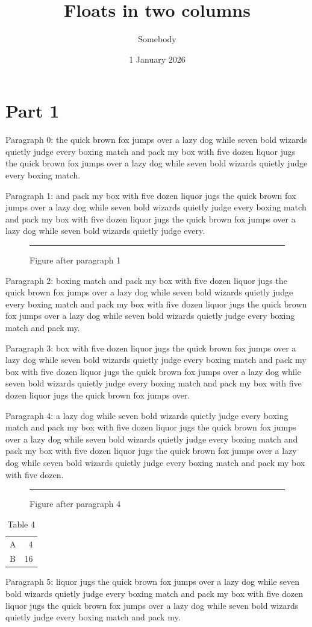 \documentclass[twocolumn]{article}
\begin{document}
\title{Floats in two columns}\author{Somebody}\date{1 January 2026}
\maketitle
\section{Part 1}
Paragraph 0: the quick brown fox jumps over a lazy dog while seven bold wizards quietly judge every boxing match and pack my box with five dozen liquor jugs the quick brown fox jumps over a lazy dog while seven bold wizards quietly judge every boxing match.

Paragraph 1: and pack my box with five dozen liquor jugs the quick brown fox jumps over a lazy dog while seven bold wizards quietly judge every boxing match and pack my box with five dozen liquor jugs the quick brown fox jumps over a lazy dog while seven bold wizards quietly judge every.

\begin{figure}[tbp]\centering\rule{0.8\columnwidth}{8em}\caption{Figure after paragraph 1}\end{figure}
Paragraph 2: boxing match and pack my box with five dozen liquor jugs the quick brown fox jumps over a lazy dog while seven bold wizards quietly judge every boxing match and pack my box with five dozen liquor jugs the quick brown fox jumps over a lazy dog while seven bold wizards quietly judge every boxing match and pack my.

Paragraph 3: box with five dozen liquor jugs the quick brown fox jumps over a lazy dog while seven bold wizards quietly judge every boxing match and pack my box with five dozen liquor jugs the quick brown fox jumps over a lazy dog while seven bold wizards quietly judge every boxing match and pack my box with five dozen liquor jugs the quick brown fox jumps over.

Paragraph 4: a lazy dog while seven bold wizards quietly judge every boxing match and pack my box with five dozen liquor jugs the quick brown fox jumps over a lazy dog while seven bold wizards quietly judge every boxing match and pack my box with five dozen liquor jugs the quick brown fox jumps over a lazy dog while seven bold wizards quietly judge every boxing match and pack my box with five dozen.

\begin{figure}[htbp]\centering\rule{0.8\columnwidth}{5em}\caption{Figure after paragraph 4}\end{figure}
\begin{table}[htb]\centering\begin{tabular}{lr}A & 4\\ B & 16\end{tabular}\caption{Table 4}\end{table}
Paragraph 5: liquor jugs the quick brown fox jumps over a lazy dog while seven bold wizards quietly judge every boxing match and pack my box with five dozen liquor jugs the quick brown fox jumps over a lazy dog while seven bold wizards quietly judge every boxing match and pack my.
\end{document}
